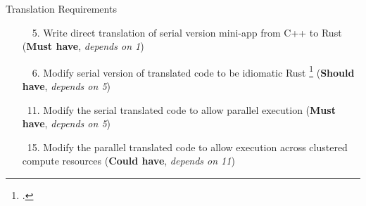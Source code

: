 \documentclass[10pt,aspectratio=169]{beamer}
\newcommand{\cmark}{\ding{51}}
\newcommand{\done}{\rlap{$\square$}{\raisebox{2pt}{\large\hspace{1pt}\textcolor{green}{\cmark}}}\hspace{-2.5pt}}
\begin{document}


\begin{frame}{Translation Requirements}
    \begin{itemize}
        \item[\done\ \ 5.]
          Write direct translation of serial version mini-app from C++ to Rust
          (\textbf{Must have}, \textit{depends on 1})
        \item[\done\ \ 6.]
          Modify serial version of translated code to be idiomatic Rust \footcite{endlerMreIdiomaticrust2023} 
          (\textbf{Should have}, \textit{depends on 5})
        \item[\done\ 11.]
          Modify the serial translated code to allow parallel execution
          (\textbf{Must have}, \textit{depends on 5})
        \item[\done\ 15.]
          Modify the parallel translated code to allow execution across clustered compute resources
          (\textbf{Could have}, \textit{depends on 11})
    \end{itemize}
\end{frame}
\end{document}
